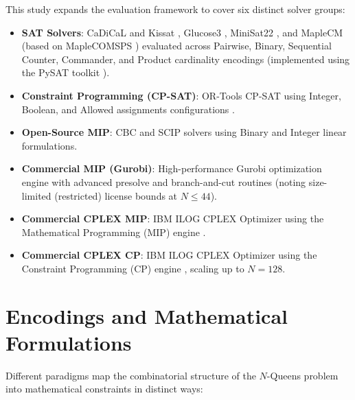 \documentclass[a4paper,fleqn]{cas-sc}
\begin{document}
This study expands the evaluation framework to cover six distinct solver groups:
\begin{itemize}
    \item \textbf{SAT Solvers}: CaDiCaL and Kissat \citep{biere2020cadical}, Glucose3 \citep{audemard2009glucose}, MiniSat22 \citep{een2003minisat}, and MapleCM (based on MapleCOMSPS \citep{liang2016maple}) evaluated across Pairwise, Binary, Sequential Counter, Commander, and Product cardinality encodings (implemented using the PySAT toolkit \citep{ignatiev2018pysat}).
    \item \textbf{Constraint Programming (CP-SAT)}: OR-Tools CP-SAT using Integer, Boolean, and Allowed assignments configurations \citep{perron2021ortools}.
    \item \textbf{Open-Source MIP}: CBC \citep{forrest2005cbc} and SCIP \citep{bestuzheva2021scip} solvers using Binary and Integer linear formulations.
    \item \textbf{Commercial MIP (Gurobi)}: High-performance Gurobi optimization engine \citep{gurobi2026} with advanced presolve and branch-and-cut routines (noting size-limited (restricted) license bounds at $N \le 44$).
    \item \textbf{Commercial CPLEX MIP}: IBM ILOG CPLEX Optimizer using the Mathematical Programming (MIP) engine \citep{cplex2026}.
    \item \textbf{Commercial CPLEX CP}: IBM ILOG CPLEX Optimizer using the Constraint Programming (CP) engine \citep{laborie2018cpoptimizer}, scaling up to $N = 128$.
\end{itemize}

\section{Encodings and Mathematical Formulations}
Different paradigms map the combinatorial structure of the $N$-Queens problem into mathematical constraints in distinct ways:
\end{document}
